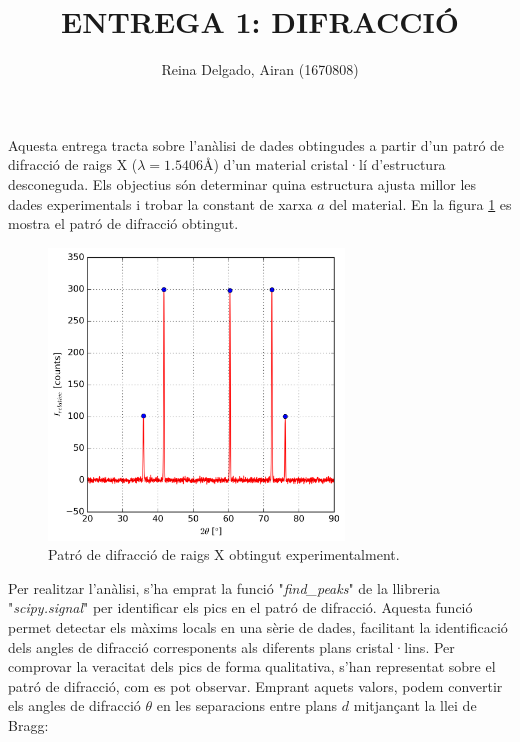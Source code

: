 \documentclass[a4paper, 11pt]{article}
\title{{\textbf{\Large ENTREGA 1: DIFRACCIÓ
}\\}}
\author{Reina Delgado, Airan (1670808)\\}
\date{}
\begin{document}
\maketitle


\noindent Aquesta entrega tracta sobre l'anàlisi de dades obtingudes a partir d'un patró de difracció de raigs X ($\lambda = 1.5406 \text{\AA}$) d'un material cristal·lí d'estructura desconeguda. Els objectius són determinar quina estructura ajusta millor les dades experimentals i trobar la constant de xarxa $a$ del material. En la figura \ref{fig:patro} es mostra el patró de difracció obtingut.

\begin{figure}[h!]
    \centering
    \includegraphics[width=0.7\textwidth]{images/grafic_experimental_peaks.png}
    \caption{Patró de difracció de raigs X obtingut experimentalment.}
    \label{fig:patro}
\end{figure}

\noindent Per realitzar l'anàlisi, s'ha emprat la funció "\textit{find\_peaks}" de la llibreria "\textit{scipy.signal}" per identificar els pics en el patró de difracció. Aquesta funció permet detectar els màxims locals en una sèrie de dades, facilitant la identificació dels angles de difracció corresponents als diferents plans cristal·lins. Per comprovar la veracitat dels pics de forma qualitativa, s'han representat sobre el patró de difracció, com es pot observar. Emprant aquets valors, podem convertir els angles de difracció $\theta$ en les separacions entre plans $d$ mitjançant la llei de Bragg:
\end{document}
